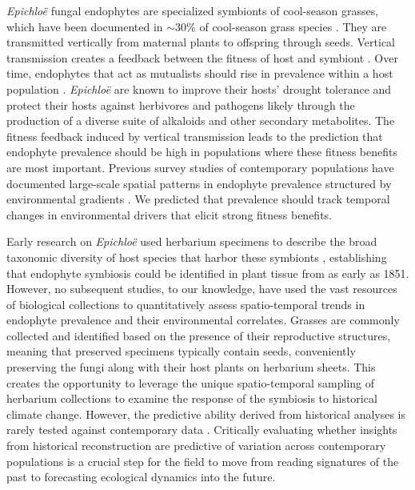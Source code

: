 \documentclass[11pt]{article}
\let\cite\citep
\begin{document}
\emph{Epichloë} fungal endophytes are specialized symbionts of cool-season grasses, which have been documented in $\sim 30$\% of cool-season grass species \citep{leuchtmann1992systematics}.
They are transmitted vertically from maternal plants to offspring through seeds.
Vertical transmission creates a feedback between the fitness of host and symbiont \citep{fine1975vectors, douglas1998host, rudgers2009fungus}. 
Over time, endophytes that act as mutualists should rise in prevalence within a host population \citep{donald2021context}. 
\emph{Epichloë} are known to improve their hosts' drought tolerance \cite{decunta2021systematic} and protect their hosts against herbivores \cite{crawford2010fungal} and pathogens \cite{xia2018role} likely through the production of a diverse suite of alkaloids and other secondary metabolites.
The fitness feedback induced by vertical transmission leads to the prediction that endophyte prevalence should be high in populations where these fitness benefits are most important. 
Previous survey studies of contemporary populations have documented large-scale spatial patterns in  endophyte prevalence structured by environmental gradients \citep{granath2007variation,bazely2007broad, afkhami2012fungal,sneck2017variation}.
We predicted that prevalence should track temporal changes in environmental drivers that elicit strong fitness benefits.

Early research on \emph{Epichloë} used herbarium specimens to describe the broad taxonomic diversity of host species that harbor these symbionts \citep{white1985endophyte}, establishing that endophyte symbiosis could be identified in plant tissue from as early as 1851.
However, no subsequent studies, to our knowledge, have used the vast resources of biological collections to quantitatively assess spatio-temporal trends in endophyte prevalence and their environmental correlates. 
Grasses are commonly collected and identified based on the presence of their reproductive structures, meaning that preserved specimens typically contain seeds, conveniently preserving the fungi along with their host plants on herbarium sheets. 
This creates the opportunity to leverage the unique spatio-temporal sampling of herbarium collections to examine the response of the symbiosis to historical climate change. 
However, the predictive ability derived from historical analyses is rarely tested against contemporary data \citep{lee2024phenological}. 
Critically evaluating whether insights from historical reconstruction are predictive of variation across contemporary populations is a crucial step for the field to move from reading signatures of the past to forecasting ecological dynamics into the future.
\end{document}
